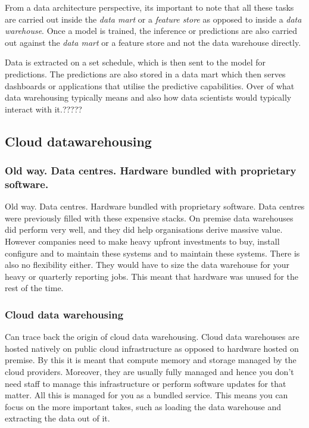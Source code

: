 \documentclass[a4paper, 11pt]{book}
\begin{document}
    From a data architecture perspective, its important to note that all these tasks are carried out inside the \textit{data mart} or a \textit{feature store} as opposed to inside a \textit{data warehouse}.
    Once a model is trained, the inference or predictions are also carried out against the \textit{data mart} or a feature store and not the data warehouse directly.

    Data is extracted on a set schedule, which is then sent to the model for predictions.
    The predictions are also stored in a data mart which then serves dashboards or applications that utilise the predictive capabilities.
    Over of what data warehousing typically means and also how data scientists would typically interact with it.?????

    \subsection{Cloud datawarehousing}

    \subsubsection{Old way. Data centres. Hardware bundled with proprietary software.}
    Old way. Data centres. Hardware bundled with proprietary software.
    Data centres were previously filled with these expensive stacks.
    On premise data warehouses did perform very well, and they did help organisations derive massive value.
    However companies need to make heavy upfront investments to buy, install configure and to maintain these systems and to maintain these systems.
    There is also no flexibility either.
    They would have to size the data warehouse for your heavy  or quarterly reporting jobs.
    This meant that hardware was unused for the rest of the time.

    \subsubsection{Cloud data warehousing}
    Can trace back the origin of cloud data warehousing.
    Cloud data warehouses are hosted natively on public cloud infrastructure as opposed to hardware hosted on premise.
    By this it is meant that compute memory and storage managed by the cloud providers.
    Moreover, they are usually fully managed and hence you don't need staff to manage this infrastructure or perform software updates for that matter.
    All this is managed for you as a bundled service.
    This means you can focus on the more important takes, such as loading the data warehouse and extracting the data out of it.
\end{document}
